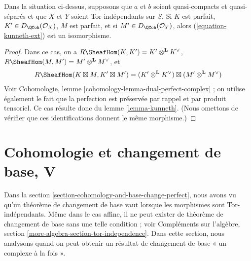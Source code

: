 \begin{lemma}
\label{lemma-kunneth-Ext}
Dans la situation ci-dessus, supposons que $a$ et $b$ soient quasi-compacts et
quasi-séparés et que $X$ et $Y$ soient Tor-indépendants sur $S$.
Si $K$ est parfait, $K' \in D_\QCoh(\mathcal{O}_X)$, $M$ est parfait, et si
$M' \in D_\QCoh(\mathcal{O}_Y)$, alors (\ref{equation-kunneth-ext})
est un isomorphisme.
\end{lemma}

\begin{proof}
Dans ce cas, on a $R\SheafHom(K, K') = K' \otimes^\mathbf{L} K^\vee$,
$R\SheafHom(M, M') = M' \otimes^\mathbf{L} M^\vee$, et
$$
R\SheafHom(K \boxtimes M, K' \boxtimes M') =
(K' \otimes^\mathbf{L} K^\vee) \boxtimes
(M' \otimes^\mathbf{L} M^\vee)
$$
Voir Cohomologie, lemme \ref{cohomology-lemma-dual-perfect-complex} ;
on utilise également le fait que la perfection est préservée par rappel
et par produit tensoriel.
Ce cas résulte donc du lemme \ref{lemma-kunneth}.
(Nous omettons de vérifier que ces identifications
donnent le même morphisme.)
\end{proof}







\section{Cohomologie et changement de base, V}
\label{section-cohomology-base-change}

\noindent
Dans la section \ref{section-cohomology-and-base-change-perfect},
nous avons vu qu'un théorème de changement de base vaut lorsque les morphismes sont Tor-indépendants.
Même dans le cas affine, il ne peut exister de théorème de changement de base sans une telle
condition ; voir
Compléments sur l'algèbre, section \ref{more-algebra-section-tor-independence}.
Dans cette section, nous analysons quand on peut obtenir un résultat de changement de base
« un complexe à la fois ».


